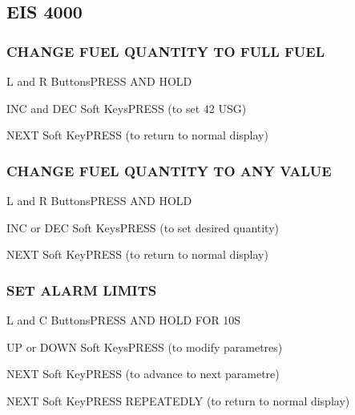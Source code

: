 \changepage{\checklistTextHeight}{\checklistTextWidth}{\checklistEvenSideMargin}{\checklistOddSideMargin}{}{\checklistTopMargin}{0pt}{0pt}{0pt}%


\begin{multicols}{2}
\raggedcolumns

\subsection*{EIS 4000}
\subsubsection*{CHANGE FUEL QUANTITY TO FULL FUEL}
\begin{enumerate*}
\item L and R Buttons\dotfill PRESS AND HOLD
\item INC and DEC Soft Keys\dotfill PRESS (to set 42 USG)
\item NEXT Soft Key\dotfill PRESS (to return to normal display)
\end{enumerate*}

\subsubsection*{CHANGE FUEL QUANTITY TO ANY VALUE}
\begin{enumerate*}
\item L and R Buttons\dotfill PRESS AND HOLD
\item INC or DEC Soft Keys\dotfill PRESS (to set desired quantity)
\item NEXT Soft Key\dotfill PRESS (to return to normal display)
\end{enumerate*}

\subsubsection*{SET ALARM LIMITS}
\begin{enumerate*}
\item L and C Buttons\dotfill PRESS AND HOLD FOR 10S
\item UP or DOWN Soft Keys\dotfill PRESS (to modify parametres)
\item NEXT Soft Key\dotfill PRESS (to advance to next parametre)
\item NEXT Soft Key\dotfill PRESS REPEATEDLY (to return to normal display)
\end{enumerate*}


\end{multicols}
